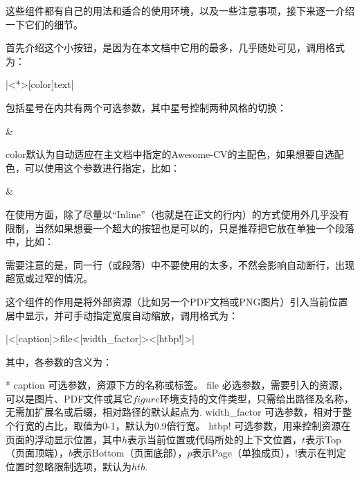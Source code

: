 这些组件都有自己的用法和适合的使用环境，以及一些注意事项，接下来逐一介绍一下它们的细节。

首先介绍这个小按钮，是因为在本文档中它用的最多，几乎随处可见，调用格式为：

|\dkbutton<*>[color]{text}|

包括星号在内共有两个可选参数，其中星号控制两种风格的切换：

\begin{center}
   \& 
\end{center}

color默认为自动适应在主文档中指定的Awesome-CV的主配色，如果想要自选配色，可以使用这个参数进行指定，比如：

\begin{center}
   \& 
\end{center}

在使用方面，除了尽量以“Inline”（也就是在正文的行内）的方式使用外几乎没有限制，当然如果想要一个超大的按钮也是可以的，只是推荐把它放在单独一个段落中，比如：

\begin{center}
  \vspace{1em}
  \vspace{1em}
\end{center}

需要注意的是，同一行（或段落）中不要使用的太多，不然会影响自动断行，出现超宽或过窄的情况。

这个组件的作用是将外部资源（比如另一个PDF文档或PNG图片）引入当前位置居中显示，并可手动指定宽度自动缩放，调用格式为：

|\dkresource<[caption]>{file}<[width_factor]><[htbp!]>|

其中，各参数的含义为：

\begin{cvskills}*
  \cvskill
  {caption}
  {可选参数，资源下方的名称或标签。}
  \cvskill
  {file}
  {必选参数，需要引入的资源，可以是图片、PDF文件或其它$figure$环境支持的文件类型，只需给出路径及名称，无需加扩展名或后缀，相对路径的默认起点为.}
  \cvskill
  {width\_factor}
  {可选参数，相对于整个行宽的占比，取值为0-1，默认为0.9倍行宽。}
  \cvskill
  {htbp!}
  {可选参数，用来控制资源在页面的浮动显示位置，其中$h$表示当前位置或代码所处的上下文位置，$t$表示Top（页面顶端），$b$表示Bottom（页面底部），$p$表示Page（单独成页），$!$表示在判定位置时忽略限制选项，默认为$htb$.}
\end{cvskills}

